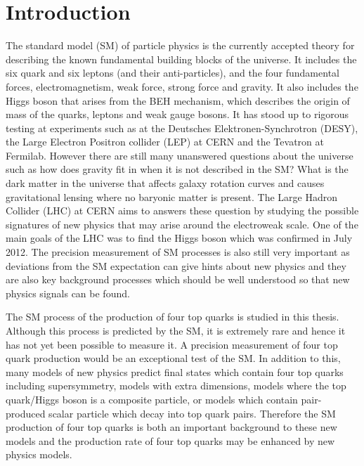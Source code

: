 \chapter{Introduction}
\label{c:intro}

The standard model (SM) of particle physics is the currently accepted theory for describing the known fundamental building blocks of the universe. It includes the six quark and six leptons (and their anti-particles), and the four fundamental forces, electromagnetism, weak force, strong force and gravity. It also includes the Higgs boson that arises from the BEH mechanism, which describes the origin of mass of the quarks, leptons and weak gauge bosons.
It has stood up to rigorous testing at experiments such as at the Deutsches Elektronen-Synchrotron (DESY), the Large Electron Positron collider (LEP) at CERN and the Tevatron at Fermilab. However there are still many unanswered questions about the universe such as how does gravity fit in when it is not described in the SM? What is the dark matter in the universe that affects galaxy rotation curves and causes gravitational lensing where no baryonic matter is present. 
The Large Hadron Collider (LHC) at CERN aims to answers these question by studying the possible signatures of new physics that may arise around the electroweak scale. One of the main goals of the LHC was to find the Higgs boson which was confirmed in July 2012. The precision measurement of SM processes is also still very important as deviations from the SM expectation can give hints about new physics and they are also key background processes which should be well understood so that new physics signals can be found.

The SM process of the production of four top quarks is studied in this thesis. Although this process is predicted by the SM, it is extremely rare and hence it has not yet been possible to measure it. A precision measurement of four top quark production would be an exceptional test of the SM. In addition to this, many models of new physics predict final states which contain four top quarks including supersymmetry, models with extra dimensions, models where the top quark/Higgs boson is a composite particle, or models which contain pair-produced scalar particle which decay into top quark pairs.
Therefore the SM production of four top quarks is both an important background to these new models and the production rate of four top quarks may be enhanced by new physics models.


